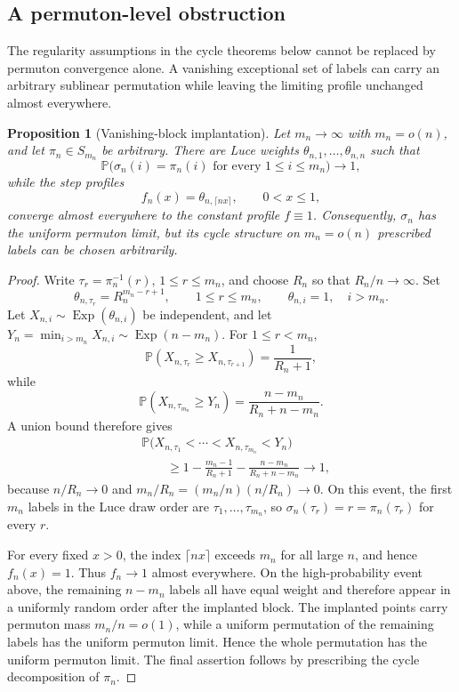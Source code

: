 \documentclass[11pt]{article}
\newtheorem{proposition}[theorem]{Proposition}
\theoremstyle{remark}
\newcommand{\Pp}{\mathbb P}
\newcommand{\Exp}{\operatorname{Exp}}
\begin{document}
\subsection{A permuton-level obstruction}\label{subsec:implantation}

The regularity assumptions in the cycle theorems below cannot be replaced by
permuton convergence alone.  A vanishing exceptional set of labels can carry an
arbitrary sublinear permutation while leaving the limiting profile unchanged
almost everywhere.

\begin{proposition}[Vanishing-block implantation]\label{prop:implantation}
Let $m_n\to\infty$ with $m_n=o(n)$, and let $\pi_n\in S_{m_n}$ be arbitrary.
There are Luce weights $\theta_{n,1},\ldots,\theta_{n,n}$ such that
\[
        \Pp\bigl(\sigma_n(i)=\pi_n(i)
        \text{ for every }1\le i\le m_n\bigr)\longrightarrow1,
\]
while the step profiles
\[
        f_n(x)=\theta_{n,\lceil nx\rceil},\qquad 0<x\le1,
\]
converge almost everywhere to the constant profile $f\equiv1$.  Consequently,
$\sigma_n$ has the uniform permuton limit,
but its cycle structure on $m_n=o(n)$ prescribed labels can be chosen
arbitrarily.
\end{proposition}

\begin{proof}
Write $\tau_r=\pi_n^{-1}(r)$, $1\le r\le m_n$, and choose $R_n$ so that
$R_n/n\to\infty$.  Set
\[
        \theta_{n,\tau_r}=R_n^{m_n-r+1},
        \qquad 1\le r\le m_n,
        \qquad
        \theta_{n,i}=1,
        \quad i>m_n.
\]
Let $X_{n,i}\sim\Exp(\theta_{n,i})$ be independent, and let
$Y_n=\min_{i>m_n}X_{n,i}\sim\Exp(n-m_n)$.  For $1\le r<m_n$,
\[
        \Pp(X_{n,\tau_r}\ge X_{n,\tau_{r+1}})
        =\frac1{R_n+1},
\]
while
\[
        \Pp(X_{n,\tau_{m_n}}\ge Y_n)
        =\frac{n-m_n}{R_n+n-m_n}.
\]
A union bound therefore gives
\[
\begin{aligned}
&\Pp\bigl(X_{n,\tau_1}<\cdots<X_{n,\tau_{m_n}}<Y_n\bigr)\\
&\qquad\ge1-\frac{m_n-1}{R_n+1}
        -\frac{n-m_n}{R_n+n-m_n}\longrightarrow1,
\end{aligned}
\]
because $n/R_n\to0$ and
$m_n/R_n=(m_n/n)(n/R_n)\to0$.
On this event, the first $m_n$ labels in the Luce draw order are
$\tau_1,\ldots,\tau_{m_n}$, so
$\sigma_n(\tau_r)=r=\pi_n(\tau_r)$ for every $r$.

For every fixed $x>0$, the index $\lceil nx\rceil$ exceeds $m_n$ for all
large $n$, and hence $f_n(x)=1$.  Thus $f_n\to1$ almost everywhere.  On the
high-probability event above, the remaining $n-m_n$ labels all have equal
weight and therefore appear in a uniformly random order after the implanted
block.  The implanted points carry permuton mass $m_n/n=o(1)$, while a uniform
permutation of the remaining labels has the uniform permuton limit.  Hence the
whole permutation has the uniform permuton limit.  The final assertion follows
by prescribing the cycle decomposition of $\pi_n$.
\end{proof}
\end{document}
